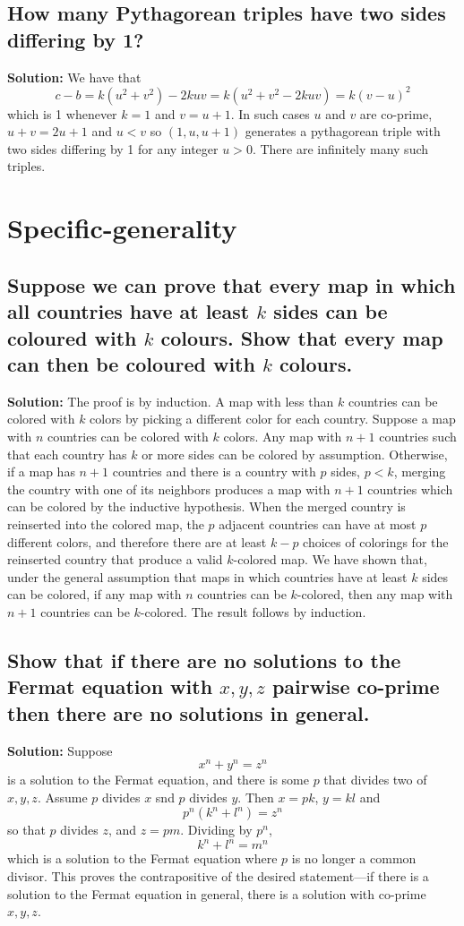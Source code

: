 \documentclass{article}
\newcommand{\exercise}[1]{\subsection{\normalfont #1}}
\newcommand{\solution}{\indent\indent \textbf{Solution: }}
\begin{document}
\exercise{How many Pythagorean triples have two sides differing by 1?}
\solution 
We have that 
$$c-b = k(u^2 + v^2) - 2kuv = k(u^2 + v^2 -2kuv) = k(v-u)^2$$ 
which is 1 whenever $k=1$ and $v = u+1$. In such cases $u$ and $v$ are co-prime, $u+v = 2u+1$ and $u<v$ so $(1,  u, u+1)$ generates a pythagorean triple with two sides differing by 1 for any integer $u >0$. There are infinitely many such triples. 

\newpage
\section{Specific-generality}

\exercise{Suppose we can prove that every map in which all countries have at least $k$ sides can be coloured with $k$ colours. Show that every map can then be coloured with $k$ colours.}
\solution
The proof is by induction. A map with less than $k$ countries can be colored with $k$ colors by picking a different color for each country. Suppose a map with $n$ countries can be colored with $k$ colors. Any map with $n+1$ countries such that each country has $k$ or more sides can be colored by assumption. Otherwise, if a map has $n+1$ countries and there is a country with $p$ sides, $p<k$, merging the country with one of its neighbors produces a map with $n+1$ countries which can be colored by the inductive hypothesis. When the merged country is reinserted into the colored map, the $p$ adjacent countries can have at most $p$ different colors, and therefore there are at least $k-p$ choices of colorings for the reinserted country that produce a valid $k$-colored map. We have shown that, under the general assumption that maps in which countries have at least $k$ sides can be colored, if any map with $n$ countries can be $k$-colored, then any map with $n+1$ countries can be $k$-colored. The result follows by induction.

\exercise{Show that if there are no solutions to the Fermat equation with $x, y, z$ pairwise co-prime then there are no solutions in general.}
\solution
Suppose 
$$x^n + y^n = z^n$$
is a solution to the Fermat equation, and there is some $p$ that divides two of $x, y, z$. Assume $p$ divides $x$ snd $p$ divides $y$. Then $x=pk$, $y=kl$ and
$$p^n(k^n + l^n) = z^n$$
so that $p$ divides $z$, and $z = pm$. Dividing by $p^n$,
$$k^n + l^n = m^n$$
which is a solution to the Fermat equation where $p$ is no longer a common divisor. This proves the contrapositive of the desired statement—if there is a solution to the Fermat equation in general, there is a solution with co-prime $x, y, z$.
\end{document}
